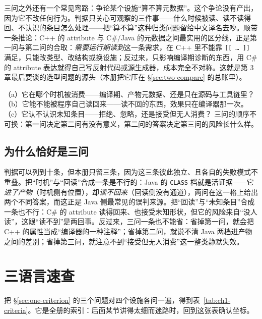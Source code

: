 \documentclass[12pt,a4paper,fontset=fandol]{ctexbook}
\newcommand{\cpp}[1]{C++#1}
\begin{document}
三问之外还有一个常见弯路：争论某个设施“算不算元数据”。这个争论没有产出，因为它不改任何行为。判据只关心可观察的三件事——什么时候被读、读不读得回、不认识的条目怎么处理——把“算不算”这种归类问题留给中文译名去吵。顺带一条推论：\cpp{} 的 attribute 与 C\#/Java 的元数据之间最实用的区分线，正是第一问与第二问的合取：\emph{需要运行期读到}这一条需求，在 \cpp{} 里不能靠 \texttt{[[\,\dots\,]]} 满足，只能改类型、改结构或换设施；反过来，只影响编译期诊断的东西，用 C\# 的 attribute 表达就得自己写反射代码或源生成器，成本完全不对称。这就是第 3 章最后要谈的选型问题的源头（本册把它压在 \S\ref{sec:two-compare} 的总账里）。

\begin{guideline}[title={判据三问的一句话版}]
（a）它在哪个时机被消费——编译期、产物元数据、还是只在源码与工具链里？
（b）它能不能被程序自己读回来——读不回的东西，效果只在编译器那一次。
（c）它认不认识未知条目——拒绝、忽略，还是接受但无人消费？
三问的顺序不可换：第一问决定第二问有没有意义，第二问的答案决定第三问的风险长什么样。
\end{guideline}

\subsection*{为什么恰好是三问}

判据可以列到十条，但本册只留三条，因为这三条彼此独立、且各自的失败模式不重叠。把“时机”与“回读”合成一条是不行的：Java 的 \texttt{CLASS} 档就是活证据——它\emph{进了产物}（时机侧有位置），却\emph{读不回来}（回读侧没有通道），两问在这一格上给出两个不同答案，而这正是 Java 侧最常见的误判来源。把“回读”与“未知条目”合成一条也不行：C\# 的 attribute 读得回来、也接受未知形状，但它的风险来自“没人读”，这跟“读不到”是两回事。反过来，三问一条也不能省：省掉第一问，就会把 \cpp{} 的属性当成“编译器的一种注释”；省掉第二问，就说不清 Java 两档进产物之间的差别；省掉第三问，就注意不到“接受但无人消费”这一整类静默失效。

\section{三语言速查}
\label{sec:one-table}

把 \S\ref{sec:one-criterion} 的三个问题对四个设施各问一遍，得到表~\ref{tab:ch1-criteria}。它是全册的索引：后面某节讲得太细而迷路时，回到这张表确认坐标。
\end{document}
